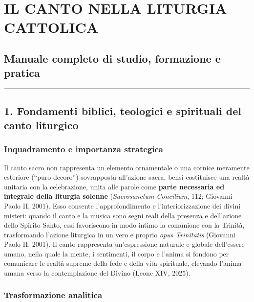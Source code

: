 \documentclass[12pt,a4paper]{article}
\begin{document}
	
	\section{IL CANTO NELLA LITURGIA CATTOLICA}\label{il-canto-nella-liturgia-cattolica}
	
	\subsection{Manuale completo di studio, formazione e pratica}\label{manuale-completo-di-studio-formazione-e-pratica}
	
	\begin{center}\rule{0.5\linewidth}{0.5pt}\end{center}
	
	\subsection{1. Fondamenti biblici, teologici e spirituali del canto liturgico}\label{fondamenti-biblici-teologici-e-spirituali-del-canto-liturgico}
	
	\subsubsection{Inquadramento e importanza strategica}\label{inquadramento-e-importanza-strategica}
	
	Il canto sacro non rappresenta un elemento ornamentale o una cornice meramente esteriore (``puro decoro'') sovrapposta all'azione sacra, bensì costituisce una realtà unitaria con la celebrazione, unita alle parole come \textbf{parte necessaria ed integrale della liturgia solenne} (\emph{Sacrosanctum Concilium}, 112; Giovanni Paolo II, 2001). Esso consente l'approfondimento e l'interiorizzazione dei divini misteri: quando il canto e la musica sono segni reali della presenza e dell'azione dello Spirito Santo, essi favoriscono in modo intimo la comunione con la Trinità, trasformando l'azione liturgica in un vero e proprio \emph{opus Trinitatis} (Giovanni Paolo II, 2001). Il canto rappresenta un'espressione naturale e globale dell'essere umano, nella quale la mente, i sentimenti, il corpo e l'anima si fondono per comunicare le realtà supreme della fede e della vita spirituale, elevando l'anima umana verso la contemplazione del Divino (Leone XIV, 2025).
	
	\subsubsection{Trasformazione analitica}\label{trasformazione-analitica}
	
\end{document}
